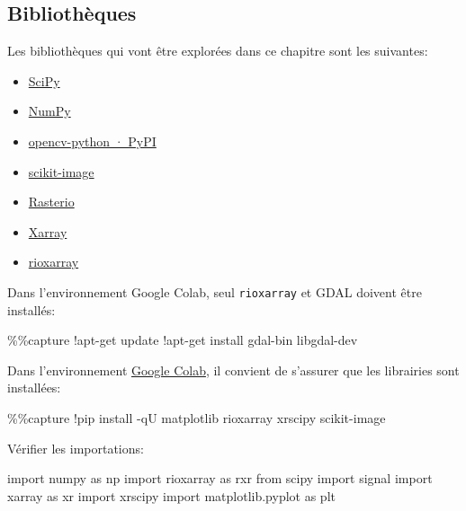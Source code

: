 \documentclass[
  11pt,
  letterpaper,
  open=any,
  twoside=false,
  french]{scrbook}
\newenvironment{Shaded}{\begin{snugshade}}{\end{snugshade}}
\newcommand{\BuiltInTok}[1]{\textcolor[rgb]{0.00,0.23,0.31}{#1}}
\newcommand{\ImportTok}[1]{\textcolor[rgb]{0.00,0.46,0.62}{#1}}
\newcommand{\NormalTok}[1]{\textcolor[rgb]{0.00,0.23,0.31}{#1}}
\newcommand{\OperatorTok}[1]{\textcolor[rgb]{0.37,0.37,0.37}{#1}}
\begin{document}
\subsection{Bibliothèques}\label{bibliothuxe8ques-1}

Les bibliothèques qui vont être explorées dans ce chapitre sont les
suivantes:

\begin{itemize}
\item
  \href{https://scipy.org/}{SciPy}
\item
  \href{https://numpy.org/}{NumPy}
\item
  \href{https://pypi.org/project/opencv-python/}{opencv-python · PyPI}
\item
  \href{https://scikit-image.org/}{scikit-image}
\item
  \href{https://rasterio.readthedocs.io/en/stable/}{Rasterio}
\item
  \href{https://docs.xarray.dev/en/stable/}{Xarray}
\item
  \href{https://corteva.github.io/rioxarray/stable/index.html}{rioxarray}
\end{itemize}

Dans l'environnement Google Colab, seul \texttt{rioxarray} et GDAL
doivent être installés:

\begin{Shaded}
\begin{Highlighting}[]
\OperatorTok{\%\%}\NormalTok{capture}
\OperatorTok{!}\NormalTok{apt}\OperatorTok{{-}}\NormalTok{get update}
\OperatorTok{!}\NormalTok{apt}\OperatorTok{{-}}\NormalTok{get install gdal}\OperatorTok{{-}}\BuiltInTok{bin}\NormalTok{ libgdal}\OperatorTok{{-}}\NormalTok{dev}
\end{Highlighting}
\end{Shaded}

Dans l'environnement \href{https://colab.research.google.com/}{Google
Colab}, il convient de s'assurer que les librairies sont installées:

\begin{Shaded}
\begin{Highlighting}[]
\OperatorTok{\%\%}\NormalTok{capture}
\OperatorTok{!}\NormalTok{pip install }\OperatorTok{{-}}\NormalTok{qU matplotlib rioxarray xrscipy scikit}\OperatorTok{{-}}\NormalTok{image}
\end{Highlighting}
\end{Shaded}

Vérifier les importations:

\begin{Shaded}
\begin{Highlighting}[]
\ImportTok{import}\NormalTok{ numpy }\ImportTok{as}\NormalTok{ np}
\ImportTok{import}\NormalTok{ rioxarray }\ImportTok{as}\NormalTok{ rxr}
\ImportTok{from}\NormalTok{ scipy }\ImportTok{import}\NormalTok{ signal}
\ImportTok{import}\NormalTok{ xarray }\ImportTok{as}\NormalTok{ xr}
\ImportTok{import}\NormalTok{ xrscipy}
\ImportTok{import}\NormalTok{ matplotlib.pyplot }\ImportTok{as}\NormalTok{ plt}
\end{Highlighting}
\end{Shaded}
\end{document}
